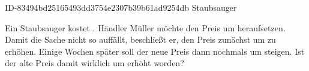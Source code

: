 \begin{exercise}
      {ID-83494bd25165493dd3754e2307b39b61ad9254db}
      {Staubsauger}
  \ifproblem\problem\par
    Ein Staubsauger kostet . Händler Müller möchte den Preis um 
    heraufsetzen. Damit die Sache nicht so auffällt, beschließt er, den Preis
    zunächst um  zu erhöhen. Einige Wochen später soll der neue Preis
    dann nochmals um  steigen. Ist der alte Preis damit wirklich um
     erhöht worden?
  \fi
\end{exercise}
